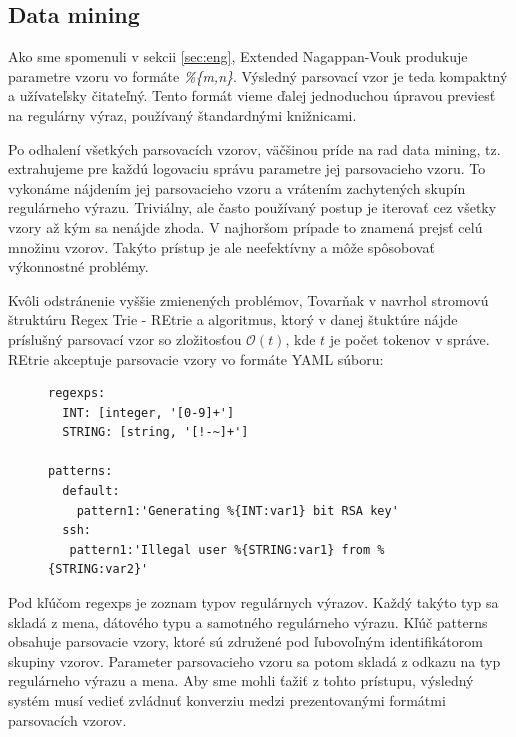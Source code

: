 \subsection{Data mining}
\label{sec:data-mining}
Ako sme spomenuli v sekcii \ref{sec:eng}, Extended Nagappan-Vouk produkuje parametre vzoru vo formáte \emph{\%\{m,n\}}. Výsledný parsovací vzor je teda kompaktný a užívateľsky čitateľný.  Tento formát vieme ďalej jednoduchou úpravou previesť na regulárny výraz, používaný štandardnými knižnicami.
\par Po odhalení všetkých parsovacích vzorov, väčšinou príde na rad data mining, tz. extrahujeme pre každú logovaciu správu parametre jej parsovacieho vzoru. To vykonáme nájdením jej parsovacieho vzoru a vrátením zachytených skupín regulárneho výrazu. Triviálny, ale často používaný postup je iterovať cez všetky vzory až kým sa nenájde zhoda. V najhoršom prípade to znamená prejsť celú množinu vzorov. Takýto prístup je ale neefektívny a môže spôsobovať výkonnostné problémy. 
\par Kvôli odstránenie vyššie zmienených problémov, Tovarňak v \parencite{regextrie} navrhol stromovú štruktúru Regex Trie - REtrie a algoritmus, ktorý v danej štuktúre nájde príslušný parsovací vzor so zložitosťou $\mathcal{O}(t)$, kde $t$ je počet tokenov v správe. REtrie akceptuje parsovacie vzory vo formáte YAML súboru:

\begin{figure}[h]
\centering
\begin{minipage}{\textwidth}
\lstset{columns=flexible,breaklines=true,breakatwhitespace=true, showstringspaces=false}
\begin{lstlisting}
regexps:
  INT: [integer, '[0-9]+']
  STRING: [string, '[!-~]+']
  
patterns:
  default:
    pattern1:'Generating %{INT:var1} bit RSA key'
  ssh:
   pattern1:'Illegal user %{STRING:var1} from %{STRING:var2}'
\end{lstlisting} 		
\end{minipage} 
\end{figure}

Pod kľúčom regexps je zoznam typov regulárnych výrazov. Každý takýto typ sa skladá z mena, dátového typu a samotného regulárneho výrazu. Kľúč patterns obsahuje parsovacie vzory, ktoré sú združené pod ľubovoľným identifikátorom skupiny vzorov. Parameter parsovacieho vzoru sa potom skladá z odkazu na typ regulárneho výrazu a mena. Aby sme mohli ťažiť z tohto prístupu, výsledný systém musí vedieť zvládnuť konverziu medzi prezentovanými formátmi parsovacích vzorov.


